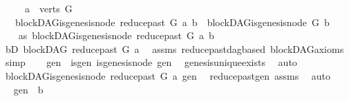 \begin{isabellebody}
\ \ \ \ \ {\isachardoublequoteopen}a\ {\isasymin}\ verts\ G{\isachardoublequoteclose}\isanewline
\ \ \ {\isachardoublequoteopen}blockDAG{\isachardot}{\kern0pt}is{\isacharunderscore}{\kern0pt}genesis{\isacharunderscore}{\kern0pt}node\ {\isacharparenleft}{\kern0pt}reduce{\isacharunderscore}{\kern0pt}past\ G\ a{\isacharparenright}{\kern0pt}\ b\ {\isasymLongrightarrow}\ blockDAG{\isachardot}{\kern0pt}is{\isacharunderscore}{\kern0pt}genesis{\isacharunderscore}{\kern0pt}node\ G\ b{\isachardoublequoteclose}\isanewline
%
\isadelimproof
%
\endisadelimproof
%
\isatagproof
{}\isamarkupfalse%
\ {\isacharminus}{\kern0pt}\isanewline
\ \ \isamarkupfalse%
\ as{}{\isacharcolon}{\kern0pt}\ {\isachardoublequoteopen}blockDAG{\isachardot}{\kern0pt}is{\isacharunderscore}{\kern0pt}genesis{\isacharunderscore}{\kern0pt}node\ {\isacharparenleft}{\kern0pt}reduce{\isacharunderscore}{\kern0pt}past\ G\ a{\isacharparenright}{\kern0pt}\ b{\isachardoublequoteclose}\isanewline
\ \ \isamarkupfalse%
\ bD{\isacharcolon}{\kern0pt}\ {\isachardoublequoteopen}blockDAG\ {\isacharparenleft}{\kern0pt}reduce{\isacharunderscore}{\kern0pt}past\ G\ a{\isacharparenright}{\kern0pt}{\isachardoublequoteclose}\ \isamarkupfalse%
\ assms\ reduce{\isacharunderscore}{\kern0pt}past{\isacharunderscore}{\kern0pt}dagbased\ blockDAG{\isacharunderscore}{\kern0pt}axioms\ \isamarkupfalse%
\ simp\isanewline
\ \ \isamarkupfalse%
\ gen\ \ is{\isacharunderscore}{\kern0pt}gen{\isacharcolon}{\kern0pt}\ {\isachardoublequoteopen}is{\isacharunderscore}{\kern0pt}genesis{\isacharunderscore}{\kern0pt}node\ gen{\isachardoublequoteclose}\ \isamarkupfalse%
\ genesis{\isacharunderscore}{\kern0pt}unique{\isacharunderscore}{\kern0pt}exists\ \isamarkupfalse%
\ auto\isanewline
\ \ \isamarkupfalse%
\ \isamarkupfalse%
\ {\isachardoublequoteopen}blockDAG{\isachardot}{\kern0pt}is{\isacharunderscore}{\kern0pt}genesis{\isacharunderscore}{\kern0pt}node\ {\isacharparenleft}{\kern0pt}reduce{\isacharunderscore}{\kern0pt}past\ G\ a{\isacharparenright}{\kern0pt}\ gen{\isachardoublequoteclose}\ \isamarkupfalse%
\ reduce{\isacharunderscore}{\kern0pt}past{\isacharunderscore}{\kern0pt}gen\ assms\ \isamarkupfalse%
\ auto\isanewline
\ \ \isamarkupfalse%
\ \isamarkupfalse%
\ {\isachardoublequoteopen}gen\ {\isacharequal}{\kern0pt}\ b{\isachardoublequoteclose}\ \isamarkupfalse%

\end{isabellebody}
